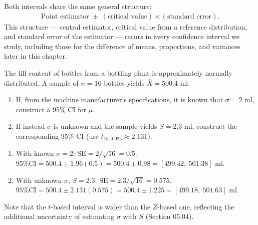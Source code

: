 \begin{observacion}
	Both intervals share the same general structure:
	\begin{align}
		\text{Point estimator} \; \pm \; (\text{critical value}) \times (\text{standard error}).
	\end{align}
	This structure --- central estimator, critical value from a reference distribution, and standard error of the estimator --- recurs in every confidence interval we study, including those for the difference of means, proportions, and variances later in this chapter.
\end{observacion}

\begin{ejemplo}
	The fill content of bottles from a bottling plant is approximately normally distributed. A sample of $n=16$ bottles yields $\bar{X}=500.4$ ml.
	\begin{enumerate}
		\item If, from the machine manufacturer's specifications, it is known that $\sigma=2$ ml, construct a 95\% CI for $\mu$.
		\item If instead $\sigma$ is unknown and the sample yields $S=2.3$ ml, construct the corresponding 95\% CI (use $t_{15,0.025}\approx 2.131$).
	\end{enumerate}
\end{ejemplo}

\begin{solucion}
	\begin{enumerate}
		\item With known $\sigma=2$: $\text{SE}=2/\sqrt{16}=0.5$. $\text{95\% CI} = 500.4 \pm 1.96(0.5) = 500.4 \pm 0.98 = [499.42,\ 501.38]$ ml.
		\item With unknown $\sigma$, $S=2.3$: $\text{SE}=2.3/\sqrt{16}=0.575$. $\text{95\% CI} = 500.4 \pm 2.131(0.575) = 500.4 \pm 1.225 = [499.18,\ 501.63]$ ml.
	\end{enumerate}
	Note that the $t$-based interval is wider than the $Z$-based one, reflecting the additional uncertainty of estimating $\sigma$ with $S$ (Section 05.04).
\end{solucion}
